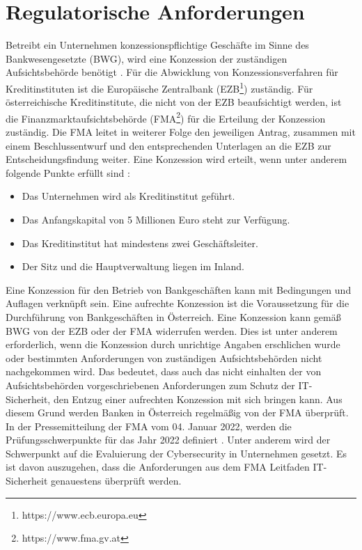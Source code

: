 \section{Regulatorische Anforderungen}
Betreibt ein Unternehmen konzessionspflichtige Geschäfte im Sinne des Bankwesengesetzte (BWG), wird eine Konzession der zuständigen Aufsichtsbehörde benötigt \autocite{ris}. Für die Abwicklung von Konzessionsverfahren für Kreditinstituten ist die Europäische Zentralbank (EZB\footnote{https://www.ecb.europa.eu}) zuständig. Für österreichische Kreditinstitute, die nicht von der EZB beaufsichtigt werden, ist die Finanzmarktaufsichtsbehörde (FMA\footnote{https://www.fma.gv.at}) für die Erteilung der Konzession zuständig. Die FMA leitet in weiterer Folge den jeweiligen Antrag, zusammen mit einem Beschlussentwurf und den entsprechenden Unterlagen an die EZB zur Entscheidungsfindung weiter. 
\bigbreak
Eine Konzession wird erteilt, wenn unter anderem folgende Punkte erfüllt sind \autocite{fma_österreich_2022}:
\begin{itemize}
    \item Das Unternehmen wird als Kreditinstitut geführt.
    \item Das Anfangskapital von 5 Millionen Euro steht zur Verfügung.
    \item Das Kreditinstitut hat mindestens zwei Geschäftsleiter.
    \item Der Sitz und die Hauptverwaltung liegen im Inland.
\end{itemize}
\bigbreak
Eine Konzession für den Betrieb von Bankgeschäften kann mit Bedingungen und Auflagen verknüpft sein. Eine aufrechte Konzession ist die Voraussetzung für die Durchführung von Bankgeschäften in Österreich.
\bigbreak
Eine Konzession kann gemäß BWG von der EZB oder der FMA widerrufen werden. Dies ist unter anderem erforderlich, wenn die Konzession durch unrichtige Angaben erschlichen wurde oder bestimmten Anforderungen von zuständigen Aufsichtsbehörden nicht nachgekommen wird. Das bedeutet, dass auch das nicht einhalten der von Aufsichtsbehörden vorgeschriebenen Anforderungen zum Schutz der IT-Sicherheit, den Entzug einer aufrechten Konzession mit sich bringen kann.
\bigbreak
Aus diesem Grund werden Banken in Österreich regelmäßig von der FMA überprüft. In der Pressemitteilung der FMA vom 04. Januar 2022, werden die Prüfungsschwerpunkte für das Jahr 2022 definiert \autocite{fma_österreich_2022_Teil2}. Unter anderem wird der Schwerpunkt auf die Evaluierung der Cybersecurity in Unternehmen gesetzt. Es ist davon auszugehen, dass die Anforderungen aus dem \glqq{}FMA Leitfaden IT-Sicherheit\grqq{} genauestens überprüft werden.

